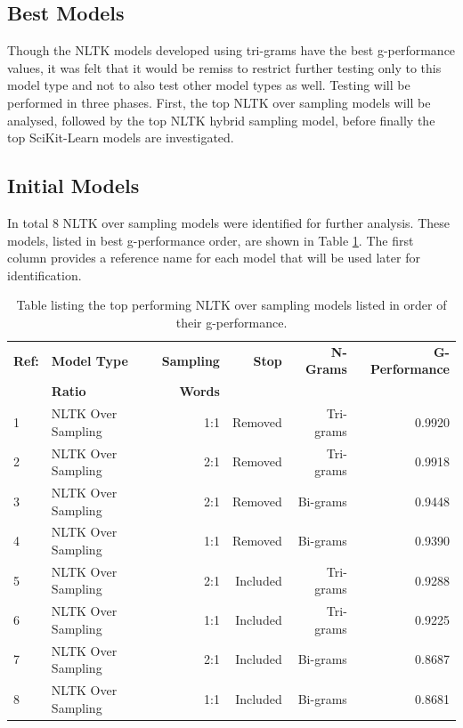 \subsection{Best Models}

Though the NLTK models developed using tri-grams have the best g-performance values, it was felt that it would be remiss to restrict further testing only to this model type and not to also test other model types as well. Testing will be performed in three phases. First, the top NLTK over sampling models will be analysed, followed by the top NLTK hybrid sampling model, before finally the top SciKit-Learn models are investigated.

\subsection{Initial Models}

In total 8 NLTK over sampling models were identified for further analysis. These models, listed in best g-performance order, are shown in Table \ref{tab:chapter5:top_nltk_os_models}. The first column provides a reference name for each model that will be used later for identification.

\begin{table}[h]
	\centering
	\caption[Top performing NLTK over sampling models]{Table listing the top performing NLTK over sampling models listed in order of their g-performance.}
	\label{tab:chapter5:top_nltk_os_models}
	\begin{tabular}{llrrrr}
		\toprule
		\textbf{Ref:} & \textbf{Model Type} & \textbf{Sampling} & \textbf{Stop}   & \textbf{N-Grams} & \textbf{G-Performance}  \\
		                    & \textbf{Ratio}    & \textbf{Words}  &                  &   \\
		\midrule
		1  & NLTK Over Sampling & 1:1 & Removed & Tri-grams & 0.9920  \\
		2  & NLTK Over Sampling & 2:1 & Removed & Tri-grams & 0.9918  \\
		3  & NLTK Over Sampling & 2:1 & Removed & Bi-grams  & 0.9448  \\
		4  & NLTK Over Sampling & 1:1 & Removed & Bi-grams  & 0.9390  \\
		5  & NLTK Over Sampling & 2:1 & Included & Tri-grams & 0.9288  \\
		6  & NLTK Over Sampling & 1:1 & Included & Tri-grams & 0.9225  \\
		7  & NLTK Over Sampling & 2:1 & Included & Bi-grams & 0.8687  \\
		8  & NLTK Over Sampling & 1:1 & Included & Bi-grams & 0.8681  \\
		\bottomrule
    \end{tabular}
\end{table}


